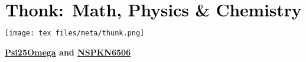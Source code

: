 \documentclass{article}
\begin{document}
\begin{align*}
    \textbf{\huge{Thonk: Math, Physics \& Chemistry}}\\
\end{align*}
\thispagestyle{empty}
\begin{center}
    \texttt{[image: tex files/meta/thunk.png]}
\end{center}
\vspace*{\fill}
\begin{center}
    \textbf{\href{https://github.com/Psi25Omega}{Psi25Omega} and \href{https://github.com/NSPKN6506}{NSPKN6506}}\\
\end{center}
\newpage
\tableofcontents
\thispagestyle{empty}
\newpage



\end{document}
